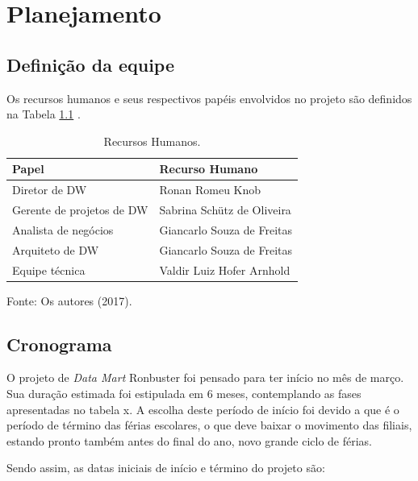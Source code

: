 
\chapter{Planejamento}

\section{Definição da equipe}

Os recursos humanos e seus respectivos papéis 
envolvidos no projeto são definidos na Tabela \ref{tab:recursos} . 

\begin{table}[!htb]
    \begin{center}
        \caption{Recursos Humanos.} \label{tab:recursos}
        \begin{tabular}{ p{4cm} | p{4cm} }
            \hline
            \textbf{Papel} & \textbf{Recurso Humano} \\
            \hline
            Diretor de DW & Ronan Romeu Knob \\
            \hline
            Gerente de projetos de DW & Sabrina Schütz de Oliveira
             \\
            \hline
            Analista de negócios & Giancarlo Souza de Freitas \\
            \hline
            Arquiteto de DW & Giancarlo Souza de Freitas \\
            \hline
            Equipe técnica & Valdir Luiz Hofer Arnhold \\
            \hline
        \end{tabular}
    \end{center}
    Fonte: Os autores (2017).
\end{table}
 
\section{Cronograma}

O projeto de \textit{Data Mart} Ronbuster 
foi pensado para ter início no mês 
de março. Sua duração estimada foi 
estipulada em 6 meses, contemplando as 
fases apresentadas no tabela x. 
A escolha deste período de início foi 
devido a que é o período de término das 
férias escolares, o que deve baixar o movimento 
das filiais, estando pronto também antes do final 
do ano, novo grande ciclo de férias.

Sendo assim, as datas iniciais de início e término do projeto são:

